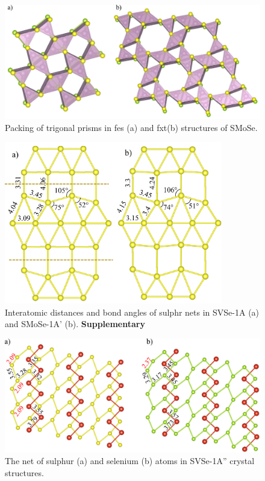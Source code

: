 \documentclass[a4paperm]{article}
\begin{document}
\begin{figure}[H]
	\includegraphics[width=\textwidth]{fes_fxt.png}
	\caption{Packing of trigonal prisms in fes (a) and fxt(b) structures of SMoSe.}
	\label{fes_fxt}
\end{figure}

\begin{figure}
	\includegraphics[width=0.85\textwidth]{airss1_s_comp.png}
	\caption{Interatomic distances and bond angles of sulphr nets in SVSe-1A (a) and SMoSe-1A' (b). \bf{Supplementary}}
	\label{airss1_s_comp}
\end{figure}

\begin{figure}[H]
	\includegraphics[width=\textwidth]{airss3_S_Se.png}
	\caption{The net of sulphur (a) and selenium (b) atoms in SVSe-1A'' crystal structures.}
	\label{airss3_S_Se}
\end{figure}
\end{document}
